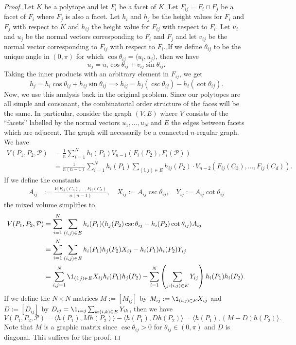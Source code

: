 \documentclass[12pt]{article}
\begin{document}
\begin{proof}
	Let $K$ be a polytope and let $F_i$ be a facet of $K$. Let $F_{ij} = F_i \cap F_j$ be a facet of $F_i$ where $F_j$ is also a facet. Let $h_i$ and $h_j$ be the height values for $F_i$ and $F_j$ with respect to $K$ and $h_{ij}$ the height value for $F_{ij}$ with respect to $F_i$. Let $u_i$ and $u_j$ be the normal vectors corresponding to $F_i$ and $F_j$ and let $v_{ij}$ be the normal vector corresponding to $F_{ij}$ with respect to $F_i$. If we define $\theta_{ij}$ to be the unique angle in $(0, \pi)$ for which $\cos \theta_{ij} = \langle u_i, u_j \rangle$, then we have 
	\[
		u_j = u_i \cos \theta_{ij} + v_{ij} \sin \theta_{ij}.
	\]
	Taking the inner products with an arbitrary element in $F_{ij}$, we get 
	\[
		h_j = h_i \cos \theta_{ij} + h_{ij} \sin \theta_{ij} \implies h_{ij} = h_j (\csc \theta_{ij}) - h_i (\cot \theta_{ij}). 
	\]
	Now, we use this analysis back in the original problem. Since our polytopes are all simple and consonant, the combinatorial order structure of the faces will be the same. In particular, consider the graph $(V, E)$ where $V$ consists of the ``facets'' labelled by the normal vectors $u_1, \ldots, u_N$ and $E$ the edges between facets which are adjacent. The graph will necessarily be a connected $n$-regular graph. We have 
	\begin{align*}
		V(P_1, P_2, \mathcal{P}) & = \frac{1}{n} \sum_{i = 1}^N h_i(P_1) V_{n-1}(F_i(P_2), F_i(\mathcal{P})) \\
		& = \frac{1}{n(n-1)} \sum_{i = 1}^N h_i(P_1) \sum_{(i, j) \in E} h_{ij}(P_2) \cdot V_{n-2}(F_{ij}(C_3), \ldots, F_{ij}(C_d)). 
	\end{align*}
	If we define the constants 
	\begin{align*}
		A_{ij} & := \frac{V(F_{ij}(C_3), \ldots, F_{ij}(C_d)}{n(n-1)}, \quad X_{ij} := A_{ij} \csc \theta_{ij}, \quad Y_{ij} := A_{ij} \cot \theta_{ij}
	\end{align*}
	the mixed volume simplifies to 
	\begin{align*}
		V(P_1, P_2, \mathcal{P}) & = \sum_{i = 1}^N \sum_{(i, j) \in E} h_i(P_1) (h_j(P_2) \csc \theta_{ij} - h_i(P_2) \cot \theta_{ij}) A_{ij} \\
		& = \sum_{i = 1}^N \sum_{(i, j) \in E} h_i(P_1) h_j(P_2) X_{ij} - h_i(P_1)h_i(P_2) Y_{ij} \\
		& = \sum_{i, j = 1}^N \1_{(i, j) \in E} X_{ij} h_i(P_1) h_j(P_2) - \sum_{i = 1}^N \left ( \sum_{j : (i, j) \in E} Y_{ij} \right ) h_i(P_1) h_i(P_2). 
	\end{align*}
	If we define the $N \times N$ matrices $M := [M_{ij}]$ by $M_{ij} := \1_{(i, j) \in E} X_{ij}$ and $D := [D_{ij}]$ by $D_{ij} = \1_{i = j} \sum_{k : (i, k) \in E} Y_{ik}$, then we have 
	\[
		V(P_1, P_2, \mathcal{P}) = \langle h(P_1), M h(P_2) \rangle - \langle h(P_1), D h(P_2) \rangle = \langle h(P_1), (M-D)h(P_2) \rangle. 
	\]
	Note that $M$ is a graphic matrix since $\csc \theta_{ij} > 0$ for $\theta_{ij} \in (0, \pi)$ and $D$ is diagonal. This suffices for the proof.
\end{proof}
\end{document}
